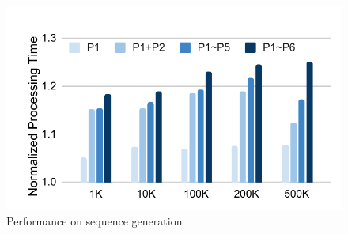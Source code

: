 \begin{figure}[htbp]
\centerline{\includegraphics[scale=0.48]{figures/fg-fasta-perf.pdf}}
\caption{Performance on sequence generation}\label{fg-fasta-perf}
\end{figure}